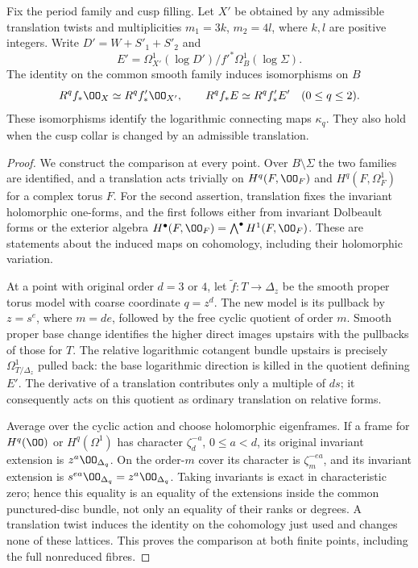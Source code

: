 \begin{proposition}\label{inv:B1.1}
Fix the period family and cusp filling. Let $X'$ be obtained by any
admissible translation twists and multiplicities $m_1=3k$, $m_2=4l$,
where $k,l$ are positive integers. Write $D'=W+S'_1+S'_2$ and
\[
E'=\Omega^1_{X'}(\log D')/f'^*\Omega^1_B(\log\Sigma).
\]
The identity on the common smooth family induces isomorphisms on $B$
\[
R^qf_*\OO_X\simeq R^qf'_*\OO_{X'},\qquad
R^qf_*E\simeq R^qf'_*E'\quad(0\le q\le2).
\]
These isomorphisms identify the logarithmic connecting maps $\kappa_q$.
They also hold when the cusp collar is changed by an admissible translation.
\end{proposition}
\begin{proof}
We construct the comparison at every point. Over $B\setminus\Sigma$
the two families are identified, and a translation acts trivially on
$H^q(F,\OO_F)$ and $H^q(F,\Omega^1_F)$ for a complex torus $F$.
For the second assertion, translation fixes the invariant holomorphic
one-forms, and the first follows either from invariant Dolbeault forms
or the exterior algebra $H^\bullet(F,\OO_F)=\bigwedge^\bullet H^1(F,\OO_F)$.
These are statements about the induced maps on cohomology, including
their holomorphic variation.

At a point with original order $d=3$ or $4$, let
$\widetilde f:T\to\Delta_z$ be the smooth proper torus model with
coarse coordinate $q=z^d$. The new model is its pullback by $z=s^e$,
where $m=de$, followed by the free cyclic quotient of order $m$.
Smooth proper base change identifies the higher direct images upstairs
with the pullbacks of those for $T$. The relative logarithmic cotangent
bundle upstairs is precisely $\Omega^1_{T/\Delta_z}$ pulled back:
the base logarithmic direction is killed in the quotient defining $E'$.
The derivative of a translation contributes only a multiple of $ds$;
it consequently acts on this quotient as ordinary translation on relative forms.

Average over the cyclic action and choose holomorphic eigenframes.
If a frame for $H^q(\OO)$ or $H^q(\Omega^1)$ has character
$\zeta_d^{-a}$, $0\le a<d$, its original invariant extension is
$z^a\OO_{\Delta_q}$. On the order-$m$ cover its character is
$\zeta_m^{-ea}$, and its invariant extension is
$s^{ea}\OO_{\Delta_q}=z^a\OO_{\Delta_q}$.
Taking invariants is exact in characteristic zero; hence this equality
is an equality of the extensions inside the common punctured-disc
bundle, not only an equality of their ranks or degrees. A translation
twist induces the identity on the cohomology just used and changes none
of these lattices. This proves the comparison at both finite points,
including the full nonreduced fibres.


\end{proof}
